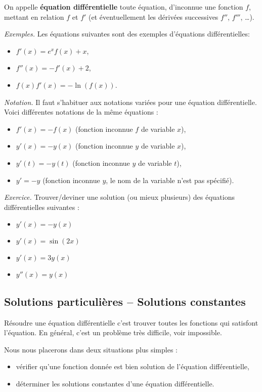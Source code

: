 \documentclass[11pt,class=report,crop=false]{standalone}
\begin{document}
 On appelle \textbf{équation différentielle} toute équation, d'inconnue une fonction $f$, mettant en relation $f$ et $f'$ (et éventuellement les dérivées successives $f''$, $f'''$, \dots).
 
 \emph{Exemples.}
 Les équations suivantes sont des exemples d'équations différentielles:
 \begin{itemize}
 	\item[] $f'(x)=e^xf(x)+x$,
 	\item[] $f''(x)=-f'(x)+2$,
 	\item[] $f(x)f'(x)=-\ln(f(x))$.
 \end{itemize}

 \emph{Notation.} Il faut s'habituer aux notations variées pour une équation différentielle.
 Voici différentes notations de la même équations :
 \begin{itemize}
 	\item[] $f'(x) = -f(x)$ \qquad (fonction inconnue $f$ de variable $x$),
 	\item[] $y'(x) = -y(x)$ \qquad (fonction inconnue $y$ de variable $x$),
 	\item[] $y'(t) = -y(t)$ \qquad (fonction inconnue $y$ de variable $t$),
 	\item[] $y' = -y$ \qquad (fonction inconnue $y$, le nom de la variable n'est pas spécifié).   
 \end{itemize}

  \emph{Exercice.} Trouver/deviner une solution (ou mieux plusieurs) des équations différentielles suivantes :
 \begin{itemize}
 	\item[] $y'(x) = -y(x)$
 	\item[] $y'(x) = \sin(2x)$
  	\item[] $y'(x) = 3y(x)$  
  	\item[] $y''(x) = y(x)$  
 \end{itemize}


\subsection*{Solutions particulières -- Solutions constantes} 

Résoudre une équation différentielle c'est trouver toutes les fonctions qui satisfont l'équation.
En général, c'est un problème très difficile, voir impossible.

Nous nous placerons dans deux situations plus simples :
\begin{itemize}
  \item vérifier qu'une fonction donnée est bien solution de l'équation différentielle,
  \item déterminer les solutions constantes d'une équation différentielle.
\end{itemize}
\end{document}
